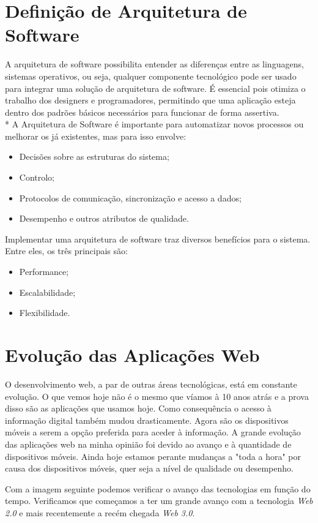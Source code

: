 
\section{Definição de Arquitetura de Software}
A arquitetura de software possibilita entender as diferenças entre as linguagens, sistemas operativos, ou seja, qualquer componente tecnológico pode ser usado para integrar uma solução de arquitetura de software. É essencial pois otimiza o trabalho dos designers e programadores, permitindo que uma aplicação esteja dentro dos padrões básicos necessários para funcionar de forma assertiva.\\*
A Arquitetura de Software é importante para automatizar novos processos ou melhorar os já existentes, mas para isso envolve:
\begin{itemize}
    \item Decisões sobre as estruturas do sistema;
    \item Controlo;
    \item Protocolos de comunicação, sincronização e acesso a dados;
    \item Desempenho e outros atributos de qualidade.
\end{itemize}

Implementar uma arquitetura de software traz diversos benefícios para o sistema. Entre eles, os três principais são:
\begin{itemize}
    \item Performance;
    \item Escalabilidade;
    \item Flexibilidade.
\end{itemize}


\section{Evolução das Aplicações Web}
O desenvolvimento web, a par de outras áreas tecnológicas, está em constante evolução. O que vemos hoje não é o mesmo que víamos à 10 anos atrás e a prova disso são as aplicações que usamos hoje. Como consequência o acesso à informação digital também mudou drasticamente. Agora são os dispositivos móveis a serem a opção preferida para aceder à informação. A grande evolução das aplicações web na minha opinião foi devido ao avanço e à quantidade de dispositivos móveis. Ainda hoje estamos perante mudanças a "toda a hora" por causa dos dispositivos móveis, quer seja a nível de qualidade ou desempenho.

Com a imagem seguinte podemos verificar o avanço das tecnologias em função do tempo. Verificamos que começamos a ter um grande avanço com a tecnologia \textit{Web 2.0} e mais recentemente a recém chegada \textit{Web 3.0}. 

